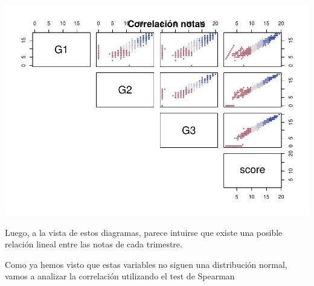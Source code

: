 \documentclass[]{article}
\newenvironment{Shaded}{\begin{snugshade}}{\end{snugshade}}
\newcommand{\DataTypeTok}[1]{\textcolor[rgb]{0.87,0.87,0.75}{#1}}
\newcommand{\DecValTok}[1]{\textcolor[rgb]{0.86,0.86,0.80}{#1}}
\newcommand{\FloatTok}[1]{\textcolor[rgb]{0.75,0.75,0.82}{#1}}
\newcommand{\KeywordTok}[1]{\textcolor[rgb]{0.94,0.87,0.69}{#1}}
\newcommand{\NormalTok}[1]{\textcolor[rgb]{0.80,0.80,0.80}{#1}}
\newcommand{\OperatorTok}[1]{\textcolor[rgb]{0.94,0.94,0.82}{#1}}
\newcommand{\OtherTok}[1]{\textcolor[rgb]{0.94,0.94,0.56}{#1}}
\newcommand{\StringTok}[1]{\textcolor[rgb]{0.80,0.58,0.58}{#1}}
\begin{document}
\begin{Shaded}
\end{Shaded}

\includegraphics{Practica2_files/figure-latex/unnamed-chunk-43-1.pdf}

Luego, a la vista de estos diagramas, parece intuirse que existe una
posible relación lineal entre las notas de cada trimestre.

Como ya hemos visto que estas variables no siguen una distribución
normal, vamos a analizar la correlación utilizando el test de Spearman

\begin{Shaded}
\end{Shaded}
\end{document}
